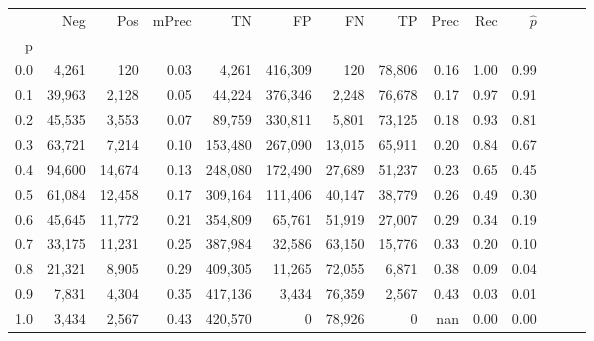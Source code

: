 \begin{tabular}{rrrrrrrrrrrrrr}
\toprule
{} &     Neg &     Pos & mPrec &       TN &       FP &      FN &      TP &  Prec &   Rec & $\hat{p}$ \\
p   &         &         &       &          &          &         &         &       &       &           \\
\midrule
0.0 &   4,261 &     120 &  0.03 &    4,261 &  416,309 &     120 &  78,806 &  0.16 &  1.00 &      0.99 \\
0.1 &  39,963 &   2,128 &  0.05 &   44,224 &  376,346 &   2,248 &  76,678 &  0.17 &  0.97 &      0.91 \\
0.2 &  45,535 &   3,553 &  0.07 &   89,759 &  330,811 &   5,801 &  73,125 &  0.18 &  0.93 &      0.81 \\
0.3 &  63,721 &   7,214 &  0.10 &  153,480 &  267,090 &  13,015 &  65,911 &  0.20 &  0.84 &      0.67 \\
0.4 &  94,600 &  14,674 &  0.13 &  248,080 &  172,490 &  27,689 &  51,237 &  0.23 &  0.65 &      0.45 \\
0.5 &  61,084 &  12,458 &  0.17 &  309,164 &  111,406 &  40,147 &  38,779 &  0.26 &  0.49 &      0.30 \\
0.6 &  45,645 &  11,772 &  0.21 &  354,809 &   65,761 &  51,919 &  27,007 &  0.29 &  0.34 &      0.19 \\
0.7 &  33,175 &  11,231 &  0.25 &  387,984 &   32,586 &  63,150 &  15,776 &  0.33 &  0.20 &      0.10 \\
0.8 &  21,321 &   8,905 &  0.29 &  409,305 &   11,265 &  72,055 &   6,871 &  0.38 &  0.09 &      0.04 \\
0.9 &   7,831 &   4,304 &  0.35 &  417,136 &    3,434 &  76,359 &   2,567 &  0.43 &  0.03 &      0.01 \\
1.0 &   3,434 &   2,567 &  0.43 &  420,570 &        0 &  78,926 &       0 &   nan &  0.00 &      0.00 \\
\bottomrule
\end{tabular}
